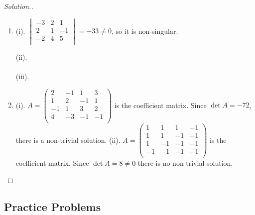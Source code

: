 \documentclass[11pt,a4paper]{article}
\theoremstyle{definition}
\newenvironment{solution}
  {\renewcommand{\qedsymbol}{}\begin{proof}[\textit{Solution}.]}
  {\end{proof}}
\begin{document}
\begin{solution}
\begin{enumerate}
\item (i). $
\begin{vmatrix}
-3&2&1\\2&1&-1\\-2&4&5\\
\end{vmatrix}
=-33\neq 0$, so it is non-singular.

(ii).\\\\ (iii).
\item (i). $A=
\begin{pmatrix}
2&-1&1&3\\1&2&-1&1\\-1&1&3&2\\4&-3&-1&-1\\
\end{pmatrix}
$  is the coefficient matrix. Since $\det A=-72$, there is a non-trivial solution.
(ii). $A=
\begin{pmatrix}
1&1&1&-1\\1&1&-1&-1\\1&-1&-1&-1\\-1&-1&-1&-1\\
\end{pmatrix}
$ is the coefficient matrix. Since $\det A=8\neq 0$ there is no non-trivial solution.
\end{enumerate}


\end{solution}

\subsection{Practice Problems}
\end{document}
